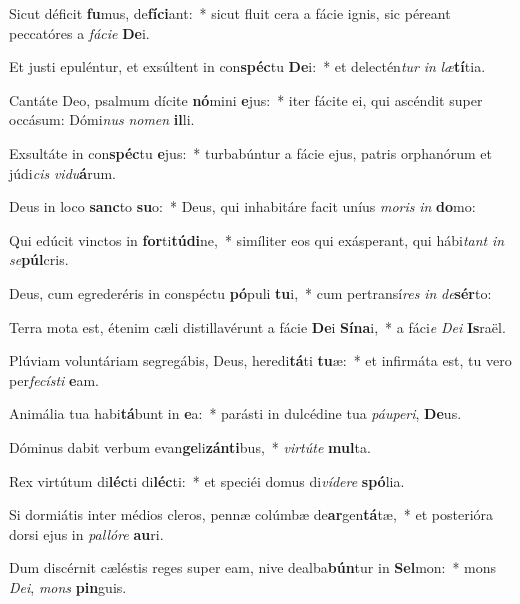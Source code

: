 \item Sicut déficit \textbf{fu}mus, de\textbf{fí}\textbf{ci}ant:~* sicut fluit cera a fácie ignis, sic péreant peccatóres a \textit{fá}\textit{ci}\textit{e} \textbf{De}i.
\item Et justi epuléntur, et exsúltent in con\textbf{spéc}tu \textbf{De}i:~* et delectén\textit{tur} \textit{in} \textit{læ}\textbf{tí}tia.
\item Cantáte Deo, psalmum dícite \textbf{nó}mini \textbf{e}jus:~* iter fácite ei, qui ascéndit super occásum: Dómi\textit{nus} \textit{no}\textit{men} \textbf{il}li.
\item Exsultáte in con\textbf{spéc}tu \textbf{e}jus:~* turbabúntur a fácie ejus, patris orphanórum et júdi\textit{cis} \textit{vi}\textit{du}\textbf{á}rum.
\item Deus in loco \textbf{sanc}to \textbf{su}o:~* Deus, qui inhabitáre facit uníus \textit{mo}\textit{ris} \textit{in} \textbf{do}mo:
\item Qui edúcit vinctos in \textbf{for}ti\textbf{tú}\textbf{di}ne,~* simíliter eos qui exásperant, qui hábi\textit{tant} \textit{in} \textit{se}\textbf{púl}cris.
\item Deus, cum egrederéris in conspéctu \textbf{pó}puli \textbf{tu}i,~* cum pertransí\textit{res} \textit{in} \textit{de}\textbf{sér}to:
\item Terra mota est, étenim cæli distillavérunt a fácie \textbf{De}i \textbf{Sí}\textbf{na}i,~* a fáci\textit{e} \textit{De}\textit{i} \textbf{Is}raël.
\item Plúviam voluntáriam segregábis, Deus, heredi\textbf{tá}ti \textbf{tu}æ:~* et infirmáta est, tu vero per\textit{fe}\textit{cís}\textit{ti} \textbf{e}am.
\item Animália tua habi\textbf{tá}bunt in \textbf{e}a:~* parásti in dulcédine tua \textit{páu}\textit{pe}\textit{ri}, \textbf{De}us.
\item Dóminus dabit verbum evan\textbf{ge}li\textbf{zán}\textbf{ti}bus,~* \textit{vir}\textit{tú}\textit{te} \textbf{mul}ta.
\item Rex virtútum di\textbf{léc}ti di\textbf{léc}ti:~* et speciéi domus di\textit{ví}\textit{de}\textit{re} \textbf{spó}lia.
\item Si dormiátis inter médios cleros, pennæ colúmbæ de\textbf{ar}gen\textbf{tá}tæ,~* et posterióra dorsi ejus in \textit{pal}\textit{ló}\textit{re} \textbf{au}ri.
\item Dum discérnit cæléstis reges super eam, nive dealba\textbf{bún}tur in \textbf{Sel}mon:~* mons \textit{De}\textit{i}, \textit{mons} \textbf{pin}guis.
